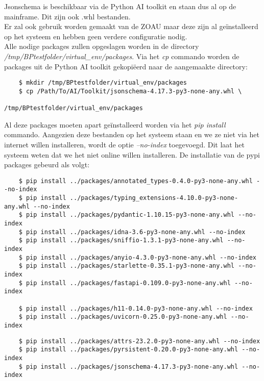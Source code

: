 Jsonschema is beschikbaar via de Python AI toolkit en staan dus al op de mainframe. Dit zijn ook .whl bestanden. \\

Er zal ook gebruik worden gemaakt van de ZOAU maar deze zijn al geïnstalleerd op het systeem en hebben geen verdere configuratie nodig. \\

Alle nodige packages zullen opgeslagen worden in de directory \textit{/tmp/BPtestfolder/virtual\_env/packages}. Via het \textit{cp} commando worden de packages uit de Python AI toolkit gekopiëerd naar de aangemaakte directory: \\

\begin{lstlisting}
    $ mkdir /tmp/BPtestfolder/virtual_env/packages
    $ cp /Path/To/AI/Toolkit/jsonschema-4.17.3-py3-none-any.whl \
                                         /tmp/BPtestfolder/virtual_env/packages
\end{lstlisting} 

Al deze packages moeten apart geïnstalleerd worden via het \textit{pip install} commando. Aangezien deze bestanden op het systeem staan en we ze niet via het internet willen installeren, wordt de optie \textit{--no-index} toegevoegd. Dit laat het systeem weten dat we het niet online willen installeren. De installatie van de pypi packages gebeurd als volgt:\\
\begin{lstlisting}
    $ pip install ../packages/annotated_types-0.4.0-py3-none-any.whl --no-index
    $ pip install ../packages/typing_extensions-4.10.0-py3-none-any.whl --no-index
    $ pip install ../packages/pydantic-1.10.15-py3-none-any.whl --no-index
    $ pip install ../packages/idna-3.6-py3-none-any.whl --no-index
    $ pip install ../packages/sniffio-1.3.1-py3-none-any.whl --no-index
    $ pip install ../packages/anyio-4.3.0-py3-none-any.whl --no-index
    $ pip install ../packages/starlette-0.35.1-py3-none-any.whl --no-index
    $ pip install ../packages/fastapi-0.109.0-py3-none-any.whl --no-index
    
    $ pip install ../packages/h11-0.14.0-py3-none-any.whl --no-index
    $ pip install ../packages/uvicorn-0.25.0-py3-none-any.whl --no-index
\end{lstlisting}

\begin{lstlisting}
    $ pip install ../packages/attrs-23.2.0-py3-none-any.whl --no-index
    $ pip install ../packages/pyrsistent-0.20.0-py3-none-any.whl --no-index
    $ pip install ../packages/jsonschema-4.17.3-py3-none-any.whl --no-index
\end{lstlisting}

